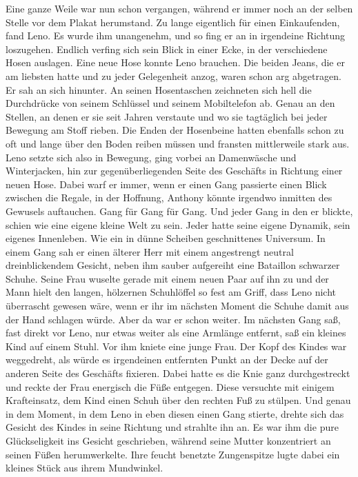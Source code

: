 \documentclass[ngerman,smalldemyvopaper,11pt,oneside,onecolumn,openright,extrafontsizes]{memoir}
\begin{document}
Eine ganze Weile war nun schon vergangen, während er immer noch an der selben Stelle vor dem Plakat herumstand. Zu lange eigentlich für einen Einkaufenden, fand Leno. Es wurde ihm unangenehm, und so fing er an in irgendeine Richtung loszugehen.
Endlich verfing sich sein Blick in einer Ecke, in der verschiedene Hosen auslagen. Eine neue Hose konnte Leno brauchen. Die beiden Jeans, die er am liebsten hatte und zu jeder Gelegenheit anzog, waren schon arg abgetragen. Er sah an sich hinunter. An seinen Hosentaschen zeichneten sich hell die Durchdrücke von seinem Schlüssel und seinem Mobiltelefon ab. Genau an den Stellen, an denen er sie seit Jahren verstaute und wo sie tagtäglich bei jeder Bewegung am Stoff rieben. Die Enden der Hosenbeine hatten ebenfalls schon zu oft und lange über den Boden reiben müssen und fransten mittlerweile stark aus. Leno setzte sich also in Bewegung, ging vorbei an Damenwäsche und Winterjacken, hin zur gegenüberliegenden Seite des Geschäfts in Richtung einer neuen Hose. Dabei warf er immer, wenn er einen Gang passierte einen Blick zwischen die Regale, in der Hoffnung, Anthony könnte irgendwo inmitten des Gewusels auftauchen. Gang für Gang für Gang. Und jeder Gang in den er blickte, schien wie eine eigene kleine Welt zu sein. Jeder hatte seine eigene Dynamik, sein eigenes Innenleben. Wie ein in dünne Scheiben geschnittenes Universum. In einem Gang sah er einen älterer Herr mit einem angestrengt neutral dreinblickendem Gesicht, neben ihm sauber aufgereiht eine Bataillon schwarzer Schuhe. Seine Frau wuselte gerade mit einem neuen Paar auf ihn zu und der Mann hielt den langen, hölzernen Schuhlöffel so fest am Griff, dass Leno nicht überrascht gewesen wäre, wenn er ihr im nächsten Moment die Schuhe damit aus der Hand schlagen würde. Aber da war er schon weiter. Im nächsten Gang saß, fast direkt vor Leno, nur etwas weiter als eine Armlänge entfernt, saß ein kleines Kind auf einem Stuhl. Vor ihm kniete eine junge Frau. Der Kopf des Kindes war weggedreht, als würde es irgendeinen entfernten Punkt an der Decke auf der anderen Seite des Geschäfts fixieren. Dabei hatte es die Knie ganz durchgestreckt und reckte der Frau energisch die Füße entgegen. Diese versuchte mit einigem Krafteinsatz, dem Kind einen Schuh über den rechten Fuß zu stülpen. Und genau in dem Moment, in dem Leno in eben diesen einen Gang stierte, drehte sich das Gesicht des Kindes in seine Richtung und strahlte ihn an. Es war ihm die pure Glückseligkeit ins Gesicht geschrieben, während seine Mutter konzentriert an seinen Füßen herumwerkelte. Ihre feucht benetzte Zungenspitze lugte dabei ein kleines Stück aus ihrem Mundwinkel.
\end{document}
